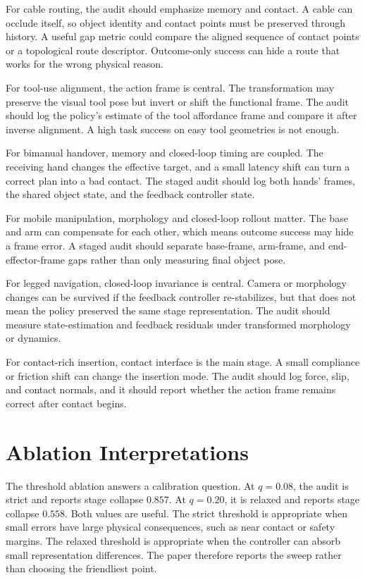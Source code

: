\documentclass{article}
\begin{document}
For cable routing, the audit should emphasize memory and contact. A cable can occlude itself, so object identity and contact points must be preserved through history. A useful gap metric could compare the aligned sequence of contact points or a topological route descriptor. Outcome-only success can hide a route that works for the wrong physical reason.

For tool-use alignment, the action frame is central. The transformation may preserve the visual tool pose but invert or shift the functional frame. The audit should log the policy's estimate of the tool affordance frame and compare it after inverse alignment. A high task success on easy tool geometries is not enough.

For bimanual handover, memory and closed-loop timing are coupled. The receiving hand changes the effective target, and a small latency shift can turn a correct plan into a bad contact. The staged audit should log both hands' frames, the shared object state, and the feedback controller state.

For mobile manipulation, morphology and closed-loop rollout matter. The base and arm can compensate for each other, which means outcome success may hide a frame error. A staged audit should separate base-frame, arm-frame, and end-effector-frame gaps rather than only measuring final object pose.

For legged navigation, closed-loop invariance is central. Camera or morphology changes can be survived if the feedback controller re-stabilizes, but that does not mean the policy preserved the same stage representation. The audit should measure state-estimation and feedback residuals under transformed morphology or dynamics.

For contact-rich insertion, contact interface is the main stage. A small compliance or friction shift can change the insertion mode. The audit should log force, slip, and contact normals, and it should report whether the action frame remains correct after contact begins.

\section{Ablation Interpretations}

The threshold ablation answers a calibration question. At $q=0.08$, the audit is strict and reports stage collapse $0.857$. At $q=0.20$, it is relaxed and reports stage collapse $0.558$. Both values are useful. The strict threshold is appropriate when small errors have large physical consequences, such as near contact or safety margins. The relaxed threshold is appropriate when the controller can absorb small representation differences. The paper therefore reports the sweep rather than choosing the friendliest point.
\end{document}
